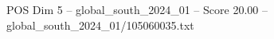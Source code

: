 \begin{textsample}{POS Dim 5 – global\_south\_2024\_01 – Score 20.00 – global\_south\_2024\_01/105060035.txt}
\end{textsample}
